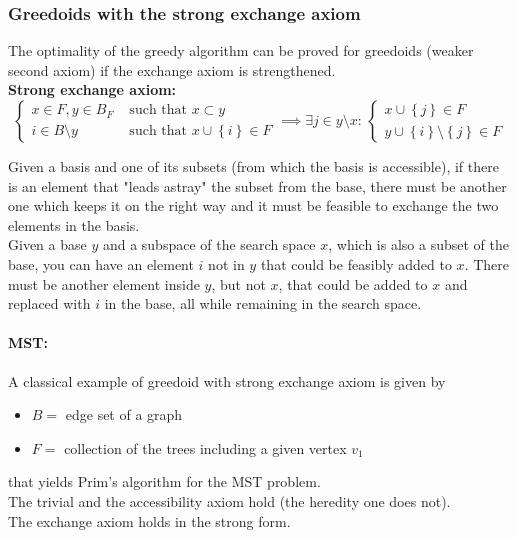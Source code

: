 \newpage

\subsubsection{Greedoids with the strong exchange axiom}
The optimality of the greedy algorithm can be proved for greedoids (weaker second axiom) if the exchange axiom is strengthened.\\

\textbf{Strong exchange axiom:}
$$ 
\begin{cases}
	x \in F, y \in B_F & \text{ such that } x \subset y \\
	i \in B \setminus y & \text{ such that } x \cup \left\{i\right\} \in F
\end{cases}
\implies \exists j \in y \setminus x: \, 
\begin{cases}
	x \cup \left\{j\right\} \in F \\
	y \cup \left\{i\right\} \setminus \left\{j\right\} \in F
\end{cases}
$$

Given a basis and one of its subsets (from which the basis is accessible), if there is an element that "leads astray" the subset from the base, there must be another one which keeps it on the right way and it must be feasible to exchange the two elements in the basis.\\

Given a base $y$ and a subspace of the search space $x$, which is also a subset of the base, you can have an element $i$ not in $y$ that could be feasibly added to $x$. There must be another element inside $y$, but not $x$, that could be added to $x$ and replaced with $i$ in the base, all while remaining in the search space.\\

\paragraph{MST:} A classical example of greedoid with strong exchange axiom is given by
\begin{itemize}
	\item $B =$ edge set of a graph
	\item $F =$ collection of the trees including a given vertex $v_1$
\end{itemize}
that yields Prim’s algorithm for the MST problem.\\

The trivial and the accessibility axiom hold (the heredity one does not).\\
The exchange axiom holds in the strong form.\\

